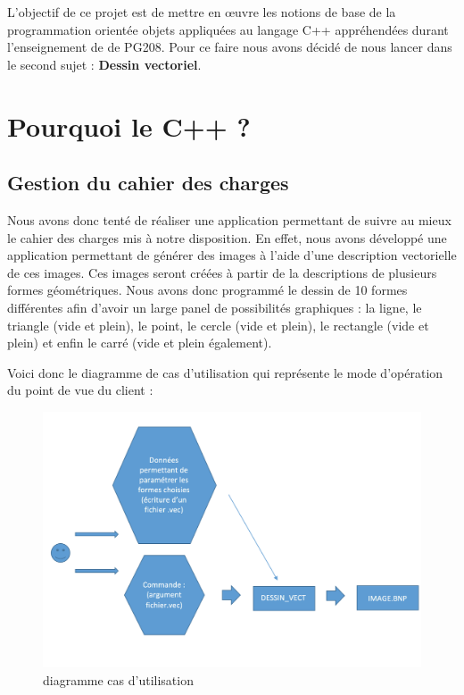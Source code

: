 \documentclass[11pt]{article}
\begin{document}
L'objectif de ce projet est de mettre en œuvre les notions de base de la programmation orientée objets appliquées au langage C++ appréhendées durant l’enseignement de de PG208. Pour ce faire nous avons décidé de nous lancer dans le second sujet : \textbf{Dessin vectoriel}.

\section{Pourquoi le C++ ?}

\subsection{Gestion du cahier des charges}
Nous avons donc tenté de réaliser une application permettant de suivre au mieux le cahier des charges mis à notre disposition. En effet, nous avons développé une application permettant de générer des images à l’aide d’une description vectorielle de ces images. Ces images seront créées à partir de la descriptions de plusieurs formes géométriques. Nous avons donc programmé le dessin de 10 formes différentes afin d'avoir un large panel de possibilités graphiques : la ligne, le triangle (vide et plein), le point, le cercle (vide et plein), le rectangle (vide et plein) et enfin le carré (vide et plein également). 

Voici donc le diagramme de cas d'utilisation qui représente le mode d'opération du point de vue du client :

\begin{figure}[!htbp]
    \begin{center}
        \includegraphics[width=13cm]{Photo1.png}
        \caption{diagramme cas d'utilisation}
    \centering
    \end{center}
\end{figure}
\end{document}
